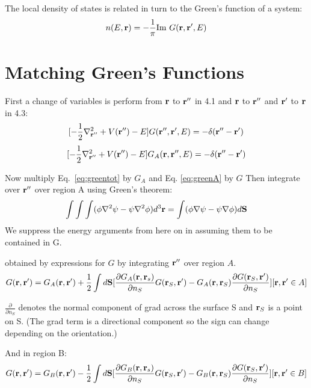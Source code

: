 The local density of states is related in turn to the Green's function of a system:
%
\begin{equation}
n(E,{\bf r}) = -\frac{1}{\pi}{\rm Im}~G({\bf r},{\bf r}',E)
\end{equation}
%

\section{Matching Green's Functions}
First a change of variables is perform from ${\bf r}$ to ${\bf r}''$ in 4.1 and ${\bf r}$ to ${\bf r}''$ and ${\bf r}'$
to ${\bf r}$ in 4.3:
%
\begin{equation}
\label{eq:greentot}
[-\frac{1}{2}\nabla^{2}_{{\bf r}''} + V({\bf r}'') - E]G({\bf r}'',{\bf r}',E)= -\delta({\bf r}''-{\bf r}')
\end{equation}
%
\begin{equation}
\label{eq:greenA}
[-\frac{1}{2}\nabla^{2}_{{\bf r}''} + V({\bf r}'') - E]G_{A}({\bf r},{\bf r}'',E)= -\delta({\bf r}''-{\bf r}')
\end{equation}

Now multiply Eq.~\ref{eq:greentot} by $G_{A}$ and Eq.
\ref{eq:greenA} by $G$ Then integrate over ${\bf r}''$ over region A using
Green's theorem:
%
\begin{equation}
\label{eq:greenthm}
\int\int\int(\phi\nabla^{2}\psi - \psi\nabla^{2}\phi)d^{3}{\bf r} 
= \int(\phi\nabla\psi-\psi\nabla\phi)d{\mathbf{S}}
\end{equation}
%
We suppress the energy arguments from here on in assuming them to be contained in G. 

obtained by expressions for $G$ by integrating ${\bf r}''$ over region $A$.
%
\begin{equation}
\label{eq:green1a}
G({\bf r},{\bf r}') = G_{A}({\bf r},{\bf r}') + \frac{1}{2} \int d\mathbf{S} 
[\frac{\partial G_{A}({\bf r},{\bf r}_{s})}{\partial n_{S}}G({\bf r}_{S},{\bf r}') - G_{A}({\bf r},{\bf r}_{S})\frac{\partial G({\bf r}_{S},{\bf r}')}{\partial n_{S}}] [{\bf r}, {\bf r}' \in A]
\end{equation}

$\frac{\partial}{\partial n_{S}}$ denotes the normal component of grad across
the surface S and ${\bf r}_{S}$ is a point on S. (The grad term is a directional component
so the sign can change depending on the orientation.)

And in region B:
%
\begin{equation}
\label{eq:green1b}
G({\bf r},{\bf r}') = G_{B}({\bf r},{\bf r}') - \frac{1}{2} \int d\mathbf{S} 
[\frac{\partial G_{B}({\bf r},{\bf r}_{s})}{\partial n_{S}}G({\bf r}_{S},{\bf r}')
- G_{B}({\bf r},{\bf r}_{S})\frac{\partial G({\bf r}_{S},{\bf r}')}{\partial n_{S}}] [{\bf r}, {\bf r}' \in B]
\end{equation}
%

